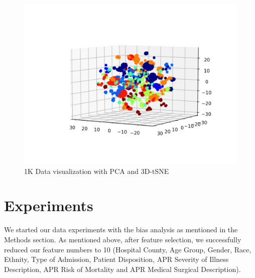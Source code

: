 \documentclass[10pt,twocolumn,letterpaper]{article}
\begin{document}
\begin{figure}
\includegraphics[scale=0.5]{1k-tsne.png}
\caption{1K Data visualization with PCA and 3D-tSNE}
\end{figure}


\section{Experiments}

We started our data experiments with the bias analysis as mentioned in the Methods section. As mentioned above, after feature selection, we successfully reduced our feature numbers to 10 (Hospital County, Age Group, Gender, Race, Ethnity, Type of Admission, Patient Disposition, APR Severity of Illness Description, APR Risk of Mortality and APR Medical Surgical Description). 
\end{document}
